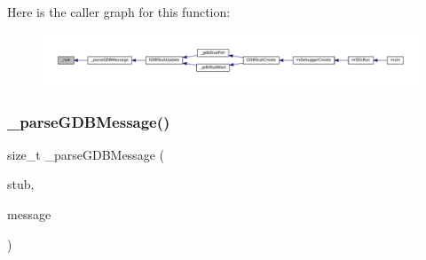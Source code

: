 Here is the caller graph for this function\+:
\nopagebreak
\begin{figure}[H]
\begin{center}
\leavevmode
\includegraphics[width=350pt]{gdb-stub_8c_a36136f8c4944f09ed1670d80a19fa31a_icgraph}
\end{center}
\end{figure}
\mbox{\label{gdb-stub_8c_ac8630a52d935a21513afd3f0d14ffe90}} 
\subsubsection{\texorpdfstring{\+\_\+parse\+G\+D\+B\+Message()}{\_parseGDBMessage()}}
{\footnotesize\ttfamily size\+\_\+t \+\_\+parse\+G\+D\+B\+Message (\begin{DoxyParamCaption}\item[{struct G\+D\+B\+Stub $\ast$}]{stub,  }\item[{const char $\ast$}]{message }\end{DoxyParamCaption})}

